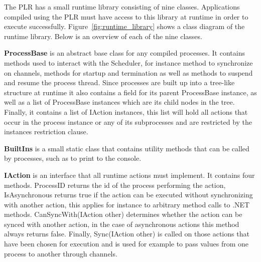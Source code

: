 	The PLR has a small runtime library consisting of nine classes. Applications
	compiled using the PLR must have access to this library at runtime in order
	to execute successfully. Figure~\ref{fig:runtime_library} shows a class 
	diagram of the runtime library. Below is an overview of each of the
	nine classes.

	\textbf{ProcessBase} is an abstract base class for any compiled processes.
	It contains methods used to interact with the \textsf{Scheduler},
	for instance method to synchronize on channels, methods for startup and
	termination as well as methods to suspend and resume the process thread.
	Since processes are built up into a tree-like structure at runtime it
	also contains a field for its parent \textsf{ProcessBase} instance, as
	well as a list of \textsf{ProcessBase} instances which are its child nodes
	in the tree. Finally, it contains a list of \textsf{IAction} instances,
	this list will hold all actions that occur in the process instance or any of 
	its subprocesses and are restricted by the instances restriction clause.
	
	\textbf{BuiltIns} is a small static class that contains utility methods
	that can be called by processes, such as to print to the console.
	
	\textbf{IAction} is an interface that all runtime actions must implement.
	It contains four methods. \textsf{ProcessID} returns the id of the
	process performing the action, \textsf{IsAsynchronous} returns true if
	the action can be executed without synchronizing with another action, 
	this applies for instance to arbitrary method calls to .NET methods.
	\textsf{CanSyncWith(IAction other)} determines whether the action can be 
	synced with another action, in the case of asynchronous actions this
	method always returns false. Finally, \textsf{Sync(IAction other)} is 
	called on those actions that have been chosen for execution and is used
	for example to pass values from one process to another through channels.

